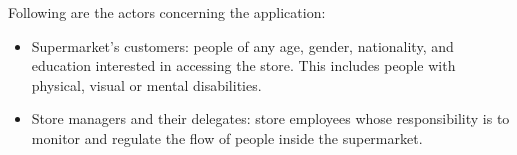 \documentclass[../../main.tex]{subfiles}
\begin{document}
	Following are the actors concerning the application:
	\begin{itemize}
		\item Supermarket's customers: people of any age, gender, nationality, and education interested in accessing the store. This includes people with physical, visual or mental disabilities.
		\item Store managers and their delegates: store employees whose responsibility is to monitor and regulate the flow of people inside the supermarket.
	\end{itemize}
\end{document}
